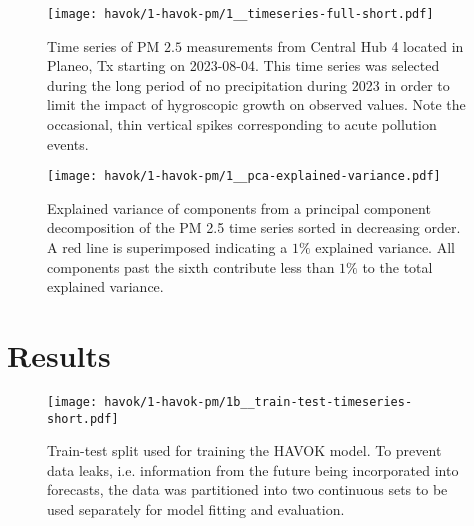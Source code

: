 \begin{figure}[h]
  \centering
  \texttt{[image: havok/1-havok-pm/1\_\_timeseries-full-short.pdf]}
  \caption{Time series of PM $2.5$ measurements from Central Hub 4 located in
    Planeo, Tx starting on 2023-08-04. This time series was selected during the
    long period of no precipitation during 2023 in order to limit the impact of
    hygroscopic growth on observed values. Note the occasional, thin vertical
    spikes corresponding to acute pollution events.}
  \label{fig:pm-timeseries-orig}
\end{figure}


\begin{figure}[h]
  \centering
  \texttt{[image: havok/1-havok-pm/1\_\_pca-explained-variance.pdf]}
  \caption{Explained variance of components from a principal component
    decomposition of the PM 2.5 time series sorted in decreasing order. A red
    line is superimposed indicating a $1\%$ explained variance. All components
    past the sixth contribute less than $1\%$ to the total explained variance. }
  \label{fig:pm-timeseries-pca}
\end{figure}


\section{Results}


\begin{figure}[h]
  \centering
  \texttt{[image: havok/1-havok-pm/1b\_\_train-test-timeseries-short.pdf]}
  \caption{Train-test split used for training the HAVOK model. To prevent data
    leaks, i.e. information from the future being incorporated into forecasts,
    the data was partitioned into two continuous sets to be used separately for
    model fitting and evaluation.}
  \label{fig:pm-train-test-split}
\end{figure}



